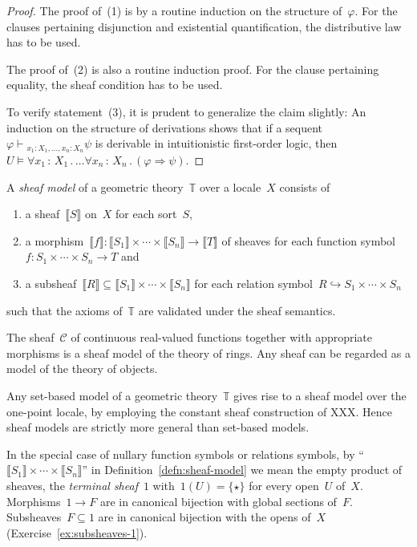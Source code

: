 \documentclass{ws-rv9x6}
\newcommand{\C}{\mathcal{C}}
\newcommand{\TT}{\mathbb{T}}
\renewcommand{\_}{\mathpunct{.}}
\newcommand{\?}{\,{:}\,}
\newcommand{\seq}[1]{\mathrel{\vdash\!\!\!_{#1}}}
\newcommand{\brak}[1]{{\llbracket{#1}\rrbracket}}
\begin{document}
\begin{proof}The proof of~(1) is by a routine induction on the structure
of~$\varphi$. For the clauses pertaining disjunction and existential
quantification, the distributive law has to be used.

The proof of~(2) is also a routine induction proof. For the clause pertaining
equality, the sheaf condition has to be used.

To verify statement~(3), it is prudent to generalize the claim slightly: An
induction on the structure of derivations shows that if a sequent~$\varphi
\seq{x_1{:}X_1,\ldots,x_n{:}X_n} \psi$ is derivable in intuitionistic first-order
logic, then~$U \models \forall x_1\?X_1\_ \ldots \forall x_n\?X_n\_ (\varphi
\Rightarrow \psi)$.
\end{proof}

\begin{definition}\label{defn:sheaf-model}
A \emph{sheaf model} of a geometric theory~$\TT$ over a locale~$X$ consists of
\begin{enumerate}
  \item a sheaf~$\brak{S}$ on~$X$ for each sort~$S$,
  \item a morphism~$\brak{f} : \brak{S_1} \times \cdots \times \brak{S_n} \to
  \brak{T}$ of sheaves for each function symbol~$f : S_1 \times \cdots \times S_n \to T$ and
  \item a subsheaf~$\brak{R} \subseteq \brak{S_1} \times \cdots \times \brak{S_n}$
  for each relation symbol~$R \hookrightarrow S_1 \times \cdots \times S_n$
\end{enumerate}
such that the axioms of~$\TT$ are validated under the sheaf semantics.
\end{definition}

\begin{example}The sheaf~$\C$ of continuous real-valued functions together with
appropriate morphisms is a sheaf model of the theory of rings. Any sheaf can be
regarded as a model of the theory of objects.\end{example}

\begin{example}\label{ex:sets-as-sheaf-models}
Any set-based model of a geometric theory~$\TT$ gives rise to a
sheaf model over the one-point locale, by employing the constant sheaf
construction of XXX. Hence sheaf models are strictly more general than
set-based models.
\end{example}

In the special case of nullary function symbols or relations symbols, by
``$\brak{S_1} \times \cdots \times \brak{S_n}$'' in
Definition~\ref{defn:sheaf-model} we mean the empty product of sheaves, the
\emph{terminal sheaf}~$1$ with~$1(U) = \{\star\}$ for every open~$U$ of~$X$.
Morphisms~$1 \to F$ are in canonical bijection with global sections of~$F$.
Subsheaves~$F \subseteq 1$ are in canonical bijection with the opens of~$X$
(Exercise~\ref{ex:subsheaves-1}).
\end{document}

